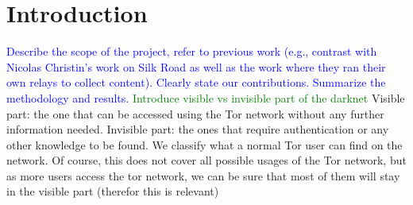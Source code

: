 \documentclass[USenglish,oneside,twocolumn]{article}
\newcommand\CONTENT[1]{\textcolor{blue}{#1}}
\newcommand\NOTE[1]{\textcolor{green}{#1}}
\begin{document}
\section{Introduction}

\CONTENT{Describe the scope of the project, refer to previous work (e.g., contrast with Nicolas Christin’s work on Silk Road as well as the work where they ran their own relays to collect content). Clearly state our contributions. Summarize the methodology and results.}
\NOTE{Introduce visible vs invisible part of the darknet}
Visible part: the one that can be accessed using the Tor network without any further information needed. Invisible part: the ones that require authentication or any other knowledge to be found. We classify what a normal Tor user can find on the network. Of course, this does not cover all possible usages of the Tor network, but as more users access the tor network, we can be sure that most of them will stay in the visible part (therefor this is relevant)
\end{document}

